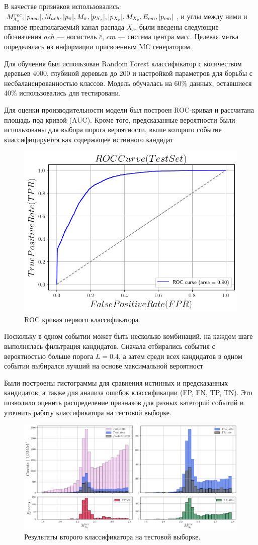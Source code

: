 В качестве признаков использовались: $M^{rec}_{\Lambda_c}, \abs{p_{ach}}, M_{ach}, \abs{p_{\pi}}, M_{\pi}, \abs{p_{X_c}}, \abs{p_{X_c}}, M_{X_c}, E_{cm}, \abs{p_{cm}}$, и углы между ними и главное предполагаемый канал распада $X_c$, были введены следующие обозначения $ach$ --- носистель $\bar c$,  $cm$ --- система центра масс. Целевая метка определялась из информации присвоенным MC генератором.


Для обучения был использован Random Forest классификатор с количеством деревьев 4000, глубиной деревьев до 200 и настройкой параметров для борьбы с несбалансированностью классов. Модель обучалась на 60\% данных, оставшиеся 40\% использовались для тестировани.


Для оценки производительности модели был построен ROC-кривая и рассчитана площадь под кривой (AUC). Кроме того, предсказанные вероятности были использованы для выбора порога вероятности, выше которого событие классифицируется как содержащее истинного кандидат

\begin{figure}[H]
    \centering
    \includegraphics[width=0.7\linewidth]{img/ROC_f.png}
    \caption{ROC кривая первого классификатора.}
\end{figure}


Поскольку в одном событии может быть несколько комбинаций, на каждом шаге выполнялась фильтрация кандидатов. Сначала отбирались события с вероятностью больше порога $L = 0.4$, а затем среди всех кандидатов в одном событии выбирался лучший на основе максимальной вероятност


Были построены гистограммы для сравнения истинных и предсказанных кандидатов, а также для анализа ошибок классификации (FP, FN, TP, TN). Это позволило оценить распределение признаков для разных категорий событий и уточнить работу классификатора на тестовой выборке.

\begin{figure}[H]
    \centering
    \includegraphics[width=1\linewidth]{img/MC_res.png}
    \caption{Результаты второго классификатора на тестовой выборке.}
\end{figure}
